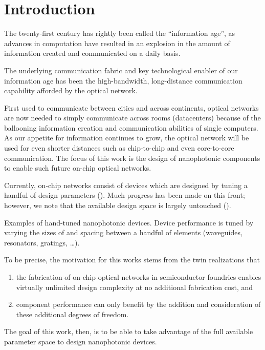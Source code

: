 \chapter{Introduction}
The twenty-first century has rightly been called the ``information age'',
    as advances in computation have resulted in an explosion
    in the amount of information created and communicated on a daily basis.

The underlying communication fabric and key technological enabler
    of our information age has been the high-bandwidth, long-distance
    communication capability afforded by the optical network.

First used to communicate between cities and across continents,
    optical networks are now needed to simply communicate across rooms (datacenters)
    because of the ballooning information creation and communication
    abilities of single computers.
As our appetite for information continues to grow,
    the optical network will be used for even shorter distances
    such as chip-to-chip and even core-to-core communication.
The focus of this work is the design of nanophotonic components
    to enable such future on-chip optical networks.

Currently, on-chip networks consist of devices
    which are designed by tuning
    a handful of design parameters ().
Much progress has been made on this front;
    however, we note that the available design space is largely untouched ().

    {Examples of hand-tuned nanophotonic devices.
    Device performance is tuned by varying the sizes of and spacing between
    a handful of elements (waveguides, resonators, gratings, \ldots).}

To be precise, the motivation for this works stems from the twin realizations that
    \begin{enumerate}
    \item the fabrication of on-chip optical networks in semiconductor 
    foundries enables virtually unlimited design complexity at no additional 
    fabrication cost, and
    \item component performance can only benefit by the addition and
    consideration of these additional degrees of freedom.
    \end{enumerate}
The goal of this work, then, is to be able to take advantage
    of the full available parameter space to design nanophotonic devices.

